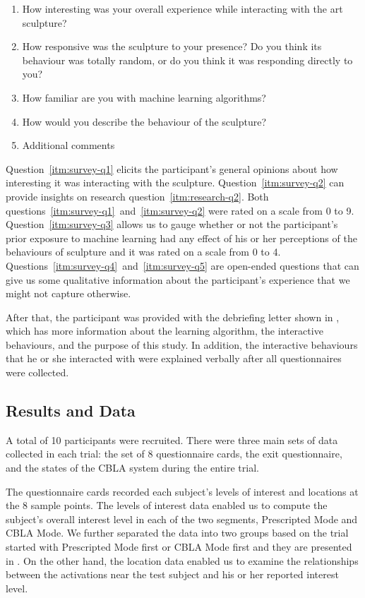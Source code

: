 \begin{enumerate}
	\item How interesting was your overall experience while interacting with the art 
	sculpture? \label{itm:survey-q1}
	\item How responsive was the sculpture to your presence?  Do you think its behaviour was totally random, or do you think it was responding directly to you? \label{itm:survey-q2}
	\item How familiar are you with machine learning algorithms? \label{itm:survey-q3}
	\item How would you describe the behaviour of the sculpture? \label{itm:survey-q4}
	\item Additional comments \label{itm:survey-q5}
\end{enumerate}

Question~\ref{itm:survey-q1} elicits the participant's general opinions about how interesting it was interacting with the sculpture. Question~\ref{itm:survey-q2} can provide insights on research question~\ref{itm:research-q2}. Both questions~\ref{itm:survey-q1}~and~\ref{itm:survey-q2} were rated on a scale from 0 to 9. Question~\ref{itm:survey-q3} allows us to gauge whether or not the participant's prior exposure to machine learning had any effect of his or her perceptions of the behaviours of sculpture and it was rated on a scale from 0 to 4. Questions~\ref{itm:survey-q4}~and~\ref{itm:survey-q5} are open-ended questions that can give us some qualitative information about the participant's experience that we might not capture otherwise.

After that, the participant was provided with the debriefing letter shown in , which has more information about the learning algorithm, the interactive behaviours, and the purpose of this study. In addition, the interactive behaviours that he or she interacted with were explained verbally after all questionnaires were collected.

\subsection{Results and Data}

A total of 10 participants were recruited. There were three main sets of data collected in each trial: the set of 8 questionnaire cards, the exit questionnaire, and the states of the CBLA system during the entire trial.

The questionnaire cards recorded each subject's levels of interest and locations at the 8 sample points. The levels of interest data enabled us to compute the subject's overall interest level in each of the two segments, Prescripted Mode and CBLA Mode. We further separated the data into two groups based on the trial started with Prescripted Mode first or CBLA Mode first and they are presented in . On the other hand, the location data enabled us to examine the relationships between the activations near the test subject and his or her reported interest level.

